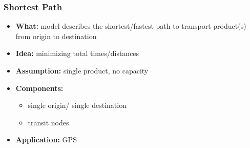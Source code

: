 \documentclass[10pt,handout,notes=show]{beamer}
\begin{document}
\begin{frame}
  \frametitle{Shortest Path  }

  \begin{itemize}
    \item \textbf{What:} model describes the shortest/fastest \alert{path} to transport product(s) from origin to destination
    \item \textbf{Idea:} minimizing total times/distances
    \item \textbf{Assumption:} single product, no capacity
    \item \textbf{Components:}
    \begin{itemize}
      \item single origin/ single destination
      \item transit nodes
    \end{itemize}
    \item \textbf{Application:} GPS
  \end{itemize}

\end{frame}
\end{document}
